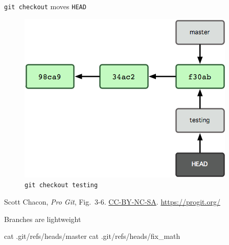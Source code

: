 \begin{frame}{\texttt{git checkout} moves \texttt{HEAD}}
  \begin{figure}
    \includegraphics[scale=0.8]{18333fig0306-tn.png}
    \\ \texttt{git checkout testing}
  \end{figure}
  \footnotesize{Scott Chacon,
    \emph{Pro Git},
    Fig.~3-6.
    \href{https://creativecommons.org/licenses/by-nc-sa/3.0/legalcode}{CC-BY-NC-SA}.
    \href{https://progit.org/}{https://progit.org/}}
\end{frame}

\begin{frame}[fragile]{Branches are lightweight}
  \begin{gitCommand}
cat .git/refs/heads/master
cat .git/refs/heads/fix_math
  \end{gitCommand}
\end{frame}

